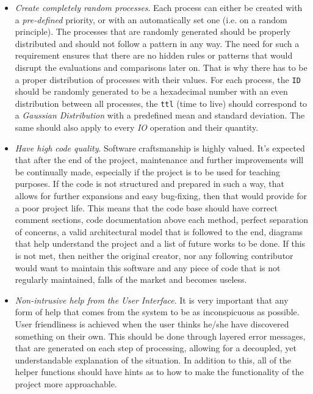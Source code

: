 \documentclass{article}
\newcommand{\code}[1]{\colorbox{codebg}{{\color{black}\texttt{#1}}}}
\begin{document}
\begin{itemize}
\item \textit{Create completely random processes}. Each process can either be created with a \textit{pre-defined} priority, or with an automatically set one (i.e. on a random principle). The processes that are randomly generated should be properly distributed and should not follow a pattern in any way. The need for such a requirement ensures that there are no hidden rules or patterns that would disrupt the evaluations and comparisons later on. That is why there has to be a proper distribution of processes with their values. For each process, the \code{ID} should be randomly generated to be a hexadecimal number with an even distribution between all processes, the \code{ttl} (time to live) should correspond to a \textit{Gaussian Distribution} with a predefined mean and standard deviation. The same should also apply to every \textit{IO} operation and their quantity.

\item \textit{Have high code quality}. Software craftsmanship is highly valued. It's expected that after the end of the project, maintenance and further improvements will be continually made, especially if the project is to be used for teaching purposes. If the code is not structured and prepared in such a way, that allows for further expansions and easy bug-fixing, then that would provide for a poor project life. This means that the code base should have correct comment sections, code documentation above each method, perfect separation of concerns, a valid architectural model that is followed to the end, diagrams that help understand the project and a list of future works to be done. If this is not met, then neither the original creator, nor any following contributor would want to maintain this software and any piece of code that is not regularly maintained, falls of the market and becomes useless.

\item \textit{Non-intrusive help from the User Interface}. It is very important that any form of help that comes from the system to be as inconspicuous as possible. User friendliness is achieved when the user thinks he/she have discovered something on their own. This should be done through layered error messages, that are generated on each step of processing, allowing for a decoupled, yet understandable explanation of the situation. In addition to this, all of the helper functions should have hints as to how to make the functionality of the project more approachable.
\end{itemize}
\end{document}
